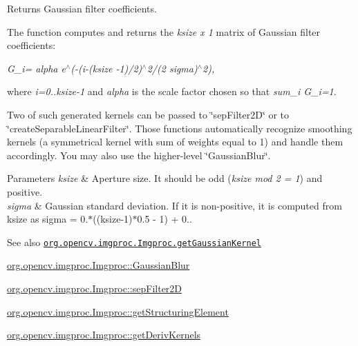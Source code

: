 Returns Gaussian filter coefficients.

The function computes and returns the {\itshape ksize x 1} matrix of Gaussian filter coefficients\+:

{\itshape G\+\_\+i= alpha {\itshape e$^\wedge$(-\/(i-\/(ksize -\/1)/2)$^\wedge$2/(2} sigma)$^\wedge$2),}

where {\itshape i=0..ksize-\/1} and {\itshape alpha} is the scale factor chosen so that {\itshape sum\+\_\+i G\+\_\+i=1}.

Two of such generated kernels can be passed to \char`\"{}sep\+Filter2\+D\char`\"{} or to \char`\"{}create\+Separable\+Linear\+Filter\char`\"{}. Those functions automatically recognize smoothing kernels (a symmetrical kernel with sum of weights equal to 1) and handle them accordingly. You may also use the higher-\/level \char`\"{}\+Gaussian\+Blur\char`\"{}.


\begin{DoxyParams}{Parameters}
{\em ksize} & Aperture size. It should be odd ({\itshape ksize mod 2 = 1}) and positive. \\
\hline
{\em sigma} & Gaussian standard deviation. If it is non-\/positive, it is computed from {\ttfamily ksize} as {\ttfamily sigma = 0.$\ast$((ksize-\/1)$\ast$0.5 -\/ 1) + 0.}.\\
\hline
\end{DoxyParams}
\begin{DoxySeeAlso}{See also}
\href{http://docs.opencv.org/modules/imgproc/doc/filtering.html#getgaussiankernel}{\tt org.\+opencv.\+imgproc.\+Imgproc.\+get\+Gaussian\+Kernel} 

\mbox{\hyperlink{classorg_1_1opencv_1_1imgproc_1_1_imgproc_a1f720ad6bef4616a3268c98abd811350}{org.\+opencv.\+imgproc.\+Imgproc\+::\+Gaussian\+Blur}} 

\mbox{\hyperlink{classorg_1_1opencv_1_1imgproc_1_1_imgproc_a7c78cbc2fc093f0008a749cfa15c3a81}{org.\+opencv.\+imgproc.\+Imgproc\+::sep\+Filter2D}} 

\mbox{\hyperlink{classorg_1_1opencv_1_1imgproc_1_1_imgproc_a91f9695453e02aa885270c0cb3cb7207}{org.\+opencv.\+imgproc.\+Imgproc\+::get\+Structuring\+Element}} 

\mbox{\hyperlink{classorg_1_1opencv_1_1imgproc_1_1_imgproc_aad7100f31c477bc17ad6c868f16822f2}{org.\+opencv.\+imgproc.\+Imgproc\+::get\+Deriv\+Kernels}} 
\end{DoxySeeAlso}
\mbox{\label{classorg_1_1opencv_1_1imgproc_1_1_imgproc_ab3727363e269af640d5254f76e14ddb6}} 
